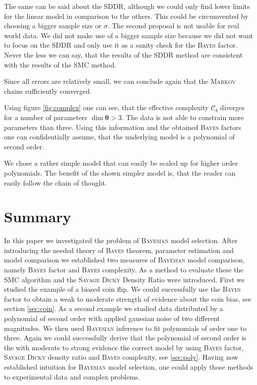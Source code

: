 \documentclass[%
 reprint,
 amsmath,amssymb,
 aps,
]{revtex4-1}
\newcommand{\btheta}{\boldsymbol{\theta}}
\begin{document}
The same can be said about the SDDR, although we could only find lower limits for the linear model in comparison to the others. This could be circumvented by choosing a bigger sample size or $\sigma$. The second proposal is not usable for real world data. We did not make use of a bigger sample size because we did not want to focus on the SDDR and only use it as a sanity check for the \textsc{Bayes} factor. Never the less we can say, that the results of the SDDR method are consistent with the results of the SMC method.

Since all errors are relatively small, we can conclude again that the \textsc{Markov} chains sufficiently converged.

Using figure \eqref{fig:complex} one can see, that the effective complexity $\mathcal{C}_b$ diverges for a number of parameters $\dim{\btheta}>3$. The data is not able to constrain more parameters than three. Using this information and the obtained \textsc{Bayes} factors one can confidentially assume, that the underlying model is a polynomial of second order. 

We chose a rather simple model that can easily be scaled up for higher order polynomials. The benefit of the shown simpler model is, that the reader can easily follow the chain of thought.  

\section{Summary}
\noindent In this paper we investigated the problem of \textsc{Bayesian} model selection. After introducing the needed theory of \textsc{Bayes} theorem, parameter estimation and model comparison we established two measures of \textsc{Bayesian} model comparison, namely \textsc{Bayes} factor and \textsc{Bayes} complexity. As a method to evaluate these the SMC algorithm and the \textsc{Savage Dicky} Density Ratio were introduced. First we studied the example of a biased coin flip. We could successfully use the \textsc{Bayes} factor to obtain a weak to moderate strength of evidence about the coin bias, see section \eqref{sec:coin}. As a second example we studied data distributed by a polynomial of second order with applied gaussian noise of two different magnitudes. We then used \textsc{Bayesian} inference to fit polynomials of order one to three. Again we could successfully derive that the polynomial of second order is the with moderate to strong evidence the correct model by using \textsc{Bayes} factor, \textsc{Savage Dicky} density ratio and \textsc{Bayes} complexity, see \eqref{sec:poly}. Having now established intuition for \textsc{Bayesian} model selection, one could apply those methods to experimental data and complex problems.


\noindent 
\FloatBarrier

\end{document}
